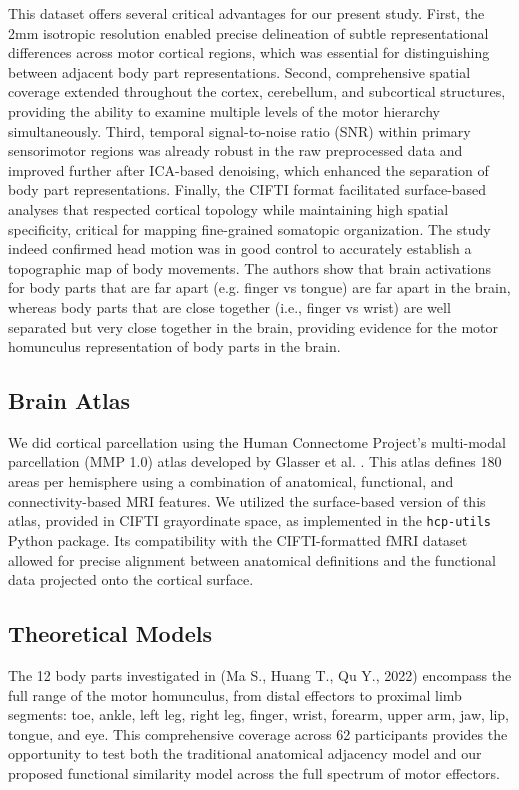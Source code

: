\documentclass{article}
\begin{document}
This dataset offers several critical advantages for our present study. First, the 2mm isotropic resolution enabled precise delineation of subtle representational differences across motor cortical regions, which was essential for distinguishing between adjacent body part representations. Second, comprehensive spatial coverage extended throughout the cortex, cerebellum, and subcortical structures, providing the ability to examine multiple levels of the motor hierarchy simultaneously. Third, temporal signal-to-noise ratio (SNR) within primary sensorimotor regions was already robust in the raw preprocessed data and improved further after ICA-based denoising, which enhanced the separation of body part representations. Finally, the CIFTI format facilitated surface-based analyses that respected cortical topology while maintaining high spatial specificity, critical for mapping fine-grained somatopic organization. The study indeed confirmed head motion was in good control to accurately establish a topographic map of body movements. The authors show that brain activations for body parts that are far apart (e.g. finger vs tongue) are far apart in the brain, whereas body parts that are close together (i.e., finger vs wrist) are well separated but very close together in the brain, providing evidence for the motor homunculus representation of body parts in the brain. 
\subsection{Brain Atlas}
We did cortical parcellation using the Human Connectome Project's multi-modal parcellation (MMP 1.0) atlas developed by Glasser et al. \cite{atlas}. This atlas defines 180 areas per hemisphere using a combination of anatomical, functional, and connectivity-based MRI features. We utilized the surface-based version of this atlas, provided in CIFTI grayordinate space, as implemented in the \texttt{hcp-utils} Python package. Its compatibility with the CIFTI-formatted fMRI dataset allowed for precise alignment between anatomical definitions and the functional data projected onto the cortical surface.
 
\subsection{Theoretical Models}
The 12 body parts investigated in (Ma S., Huang T., Qu Y., 2022) encompass the full range of the motor homunculus, from distal effectors to proximal limb segments: toe, ankle, left leg, right leg, finger, wrist, forearm, upper arm, jaw, lip, tongue, and eye. This comprehensive coverage across 62 participants provides the opportunity to test both the traditional anatomical adjacency model and our proposed functional similarity model across the full spectrum of motor effectors.
\end{document}
